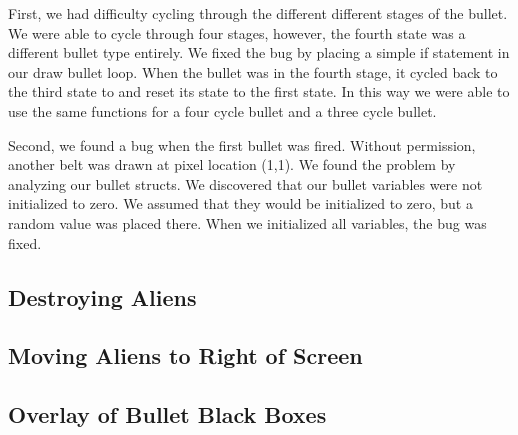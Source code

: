 \documentclass[11pt,letter,oneside]{report}
\begin{document}
First, we had difficulty cycling through the different different stages of the bullet. We were able to cycle through four stages, however, the fourth state was a different bullet type entirely. We fixed the bug by placing a simple if statement in our draw bullet loop. When the bullet was in the fourth stage, it cycled back to the third state to and reset its state to the first state. In this way we were able to use the same functions for a four cycle bullet and a three cycle bullet.

Second, we found a bug when the first bullet was fired. Without permission, another belt was drawn at pixel location (1,1). We found the problem by analyzing our bullet structs. We discovered that our bullet variables were not initialized to zero. We assumed that they would be initialized to zero, but a random value was placed there. When we initialized all variables, the bug was fixed.

\subsection{Destroying Aliens}
\subsection{Moving Aliens to Right of Screen}
\subsection{Overlay of Bullet Black Boxes}
\end{document}
